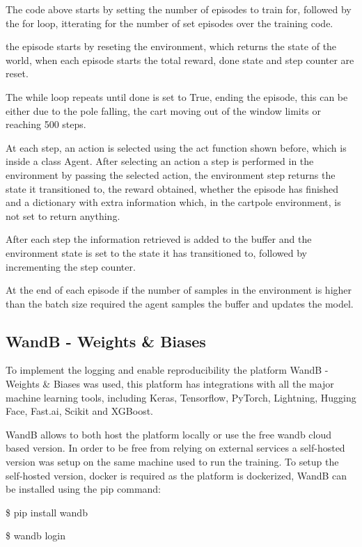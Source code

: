 The code above starts by setting the number of episodes to train for, followed by the for loop, itterating for the number of set episodes over the training code.

the episode starts by reseting the environment, which returns the state of the world, when each episode starts the total reward, done state and step counter are reset.

The while loop repeats until done is set to True, ending the episode, this can be either due to the pole falling, the cart moving out of the window limits or reaching 500 steps.

At each step, an action is selected using the act function shown before, which is inside a class Agent. After selecting an action a step is performed in the environment by passing the selected action,
the environment step returns the state it transitioned to, the reward obtained, whether the episode has finished and a dictionary with extra information which, in the cartpole environment, is not set to return anything.

After each step the information retrieved is added to the buffer and the environment state is set to the state it has transitioned to, followed by incrementing the step counter.

At the end of each episode if the number of samples in the environment is higher than the batch size required the agent samples the buffer and updates the model.


\subsection*{WandB - Weights \& Biases}
To implement the logging and enable reproducibility the platform WandB - Weights \& Biases was used, this platform has integrations with all the major machine learning tools, including Keras, Tensorflow, PyTorch, Lightning, Hugging Face, Fast.ai, Scikit and XGBoost.\cite{wandb}

WandB allows to both host the platform locally or use the free wandb cloud based version. In order to be free from relying on external services a self-hosted version was setup on the same machine used to run the training.
To setup the self-hosted version, docker is required as the platform is dockerized, WandB can be installed using the pip command:

\begin{center}
    \$ pip install wandb 

    \$ wandb login
\end{center}

